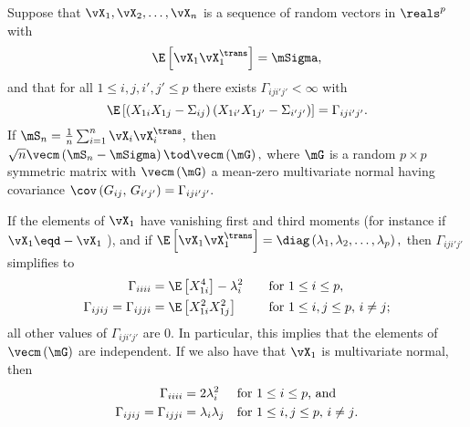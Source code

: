 \begin{proposition}\label{P:sample-cov-limit}
Suppose that 
\(
    \vX_1, \vX_2, \ldots, \vX_n
\)
is a sequence of \iid random vectors in $\reals^p$ with 
\[
    \E \left[
        \vX_1 \vX_1^\trans
    \right]
    =
    \mSigma,
\]
and that for all $1 \leq i,j,i',j' \leq p$ there exists 
\(
    \Gamma_{iji'j'} < \infty
\)
with
\[
    \E \left[
        \left(
            X_{1i} X_{1j}
            -
            \Sigma_{ij}
        \right)
        \left(
            X_{1i'} X_{1j'}
            -
            \Sigma_{i'j'}
        \right)
    \right]
    =
    \Gamma_{iji'j'}.
\]
If
\(
    \mS_n
    =
    \frac{1}{n}
    \sum_{i=1}^n
        \vX_i \vX_i^\trans,
\)
then
\(
    \sqrt{n}
    \vecm \left( 
        \mS_n - \mSigma 
    \right)
    \tod
    \vecm \left( 
        \mG
    \right),
\)
where $\mG$ is a random $p \times p$ symmetric matrix with 
\(
    \vecm \left( \mG \right)
\)
a mean-zero multivariate normal having covariance
\(
    \cov \left(
        G_{ij}, \,
        G_{i'j'}
    \right)
    =
    \Gamma_{iji'j'}.
\)
\end{proposition}

\noindent
If the elements of $\vX_1$ have vanishing first and third moments (for instance if
\(
    \vX_1 \eqd - \vX_1
\)
), and if
\(
    \E \left[
        \vX_1 \vX_1^\trans
    \right]
    =
    \diag \left(
        \lambda_1,
        \lambda_2,
        \ldots,
        \lambda_p
    \right),
\)
then $\Gamma_{iji'j'}$ simplifies to
\begin{subequations}
\begin{align}
    \Gamma_{iiii} &= \E \left[ X_{1i}^4 \right] - \lambda_i^2 \quad 
                         &&\text{for $1 \leq i \leq p$}, \\
    \Gamma_{ijij} = \Gamma_{ijji} &= \E \left[ X_{1i}^2 X_{1j}^2 \right]
                         &&\text{for $ 1 \leq i,j \leq p$, $i \neq j$;}
\end{align}
\end{subequations}
all other values of $\Gamma_{iji'j'}$ are $0$.  In particular, this
implies that the elements of $\vecm \left( \mG \right)$ are independent.
If we also have that $\vX_1$ is multivariate normal, then 
\begin{subequations}
\begin{align}
    \Gamma_{iiii} &= 2 \lambda_i^2
                         &&\text{for $1 \leq i \leq p$, and} \\    
    \Gamma_{ijij} = \Gamma_{ijji} &= \lambda_i \lambda_j
                         &&\text{for $ 1 \leq i,j \leq p$, $i \neq j$.}
\end{align}
\end{subequations}


